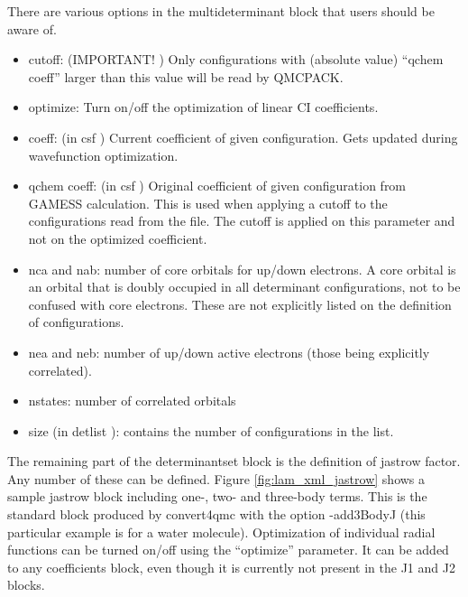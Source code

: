 There are various options in the multideterminant block that users should be aware of.
\begin{itemize}
  \item{cutoff: (IMPORTANT! ) Only configurations with (absolute value) “qchem coeff”
larger than this value will be read by QMCPACK.}
  \item{optimize: Turn on/off the optimization of linear CI coefficients.}
  \item{coeff: (in csf ) Current coefficient of given configuration. Gets updated during 
wavefunction optimization.}
  \item{qchem coeff: (in csf ) Original coefficient of given configuration from GAMESS 
calculation. This is used when applying a cutoff to the configurations read from the file.
The cutoff is applied on this parameter and not on the optimized coefficient.}
  \item{nca and nab: number of core orbitals for up/down electrons. A core orbital is an
orbital that is doubly occupied in all determinant configurations, not to be confused
with core electrons. These are not explicitly listed on the definition of configurations.}
  \item{nea and neb: number of up/down active electrons (those being explicitly correlated).}
  \item{nstates: number of correlated orbitals}
  \item{size (in detlist ): contains the number of configurations in the list.}
\end{itemize}
The remaining part of the determinantset block is the definition of jastrow factor. Any
number of these can be defined. Figure \ref{fig:lam_xml_jastrow} shows a sample jastrow 
block including one-, two- and three-body terms. This is the standard block produced by 
convert4qmc with the option -add3BodyJ (this particular example is for a water molecule). 
Optimization of individual radial functions can be turned on/off using the “optimize” 
parameter. It can be added to any coefficients block, even though it is currently not 
present in the J1 and J2 blocks.

